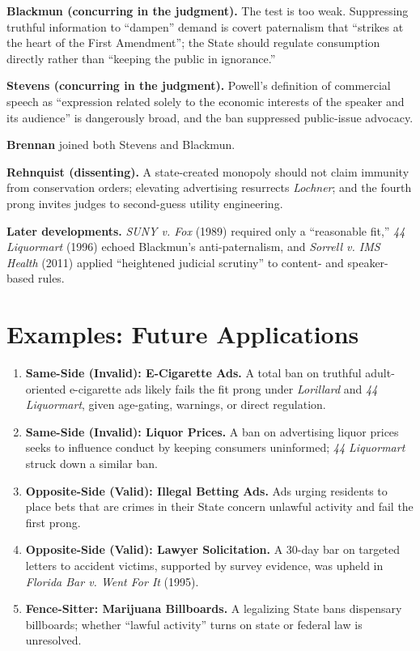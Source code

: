 \documentclass[12pt]{article}
\begin{document}
\textbf{Blackmun (concurring in the judgment).} The test is too weak. Suppressing truthful information to ``dampen'' demand is covert paternalism that ``strikes at the heart of the First Amendment''; the State should regulate consumption directly rather than ``keeping the public in ignorance.''

\textbf{Stevens (concurring in the judgment).} Powell's definition of commercial speech as ``expression related solely to the economic interests of the speaker and its audience'' is dangerously broad, and the ban suppressed public-issue advocacy.

\textbf{Brennan} joined both Stevens and Blackmun.

\textbf{Rehnquist (dissenting).} A state-created monopoly should not claim immunity from conservation orders; elevating advertising resurrects \textit{Lochner}; and the fourth prong invites judges to second-guess utility engineering.

\textbf{Later developments.} \textit{SUNY v. Fox} (1989) required only a ``reasonable fit,'' \textit{44 Liquormart} (1996) echoed Blackmun's anti-paternalism, and \textit{Sorrell v. IMS Health} (2011) applied ``heightened judicial scrutiny'' to content- and speaker-based rules.

\section{Examples: Future Applications}

\begin{enumerate}
\item \textbf{Same-Side (Invalid): E-Cigarette Ads.} A total ban on truthful adult-oriented e-cigarette ads likely fails the fit prong under \textit{Lorillard} and \textit{44 Liquormart}, given age-gating, warnings, or direct regulation.
\item \textbf{Same-Side (Invalid): Liquor Prices.} A ban on advertising liquor prices seeks to influence conduct by keeping consumers uninformed; \textit{44 Liquormart} struck down a similar ban.
\item \textbf{Opposite-Side (Valid): Illegal Betting Ads.} Ads urging residents to place bets that are crimes in their State concern unlawful activity and fail the first prong.
\item \textbf{Opposite-Side (Valid): Lawyer Solicitation.} A 30-day bar on targeted letters to accident victims, supported by survey evidence, was upheld in \textit{Florida Bar v. Went For It} (1995).
\item \textbf{Fence-Sitter: Marijuana Billboards.} A legalizing State bans dispensary billboards; whether ``lawful activity'' turns on state or federal law is unresolved.
\end{enumerate}
\end{document}
